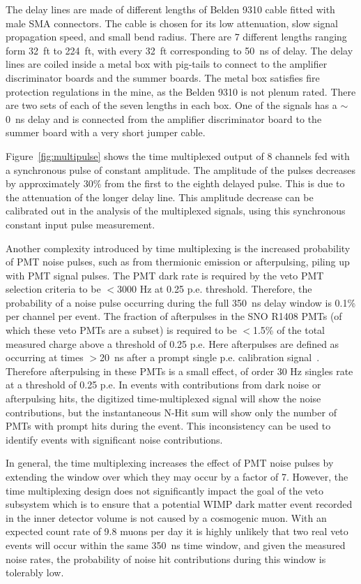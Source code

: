 \documentclass[review,number,sort&compress]{elsarticle}
\begin{document}
The delay lines are made of different lengths of Belden 9310 cable
fitted with male SMA connectors. The cable is chosen for its low
attenuation, slow signal propagation speed, and small bend radius.
There are 7 different lengths ranging form 32~ft to 224~ft, with every
32~ft corresponding to 50~ns of delay. The delay lines are coiled
inside a metal box with pig-tails to connect to the amplifier
discriminator boards and the summer boards. The metal box satisfies
fire protection regulations in the mine, as the Belden 9310 is not
plenum rated. There are two sets of each of the seven lengths in each
box.  One of the signals has a $\sim$0~ns delay and is connected from
the amplifier discriminator board to the summer board with a very short
jumper cable.

Figure~\ref{fig:multipulse} shows the time multiplexed output of 8
channels fed with a synchronous pulse of constant amplitude.  The
amplitude of the pulses decreases by approximately 30\% from the first
to the eighth delayed pulse.  This is due to the attenuation of the
longer delay line.  This amplitude decrease can be calibrated out in
the analysis of the multiplexed signals, using this synchronous
constant input pulse measurement.

Another complexity introduced by time multiplexing is the
increased probability of PMT noise pulses, such as from thermionic
emission or afterpulsing, piling up with PMT signal pulses.  The PMT
dark rate is required by the veto PMT selection criteria to be $<$3000
Hz at 0.25 p.e. threshold.  Therefore, the probability of a noise
pulse occurring during the full 350~ns delay window is 0.1\% per
channel per event.  The fraction of afterpulses in the SNO R1408 PMTs
(of which these veto PMTs are a subset) is required to be $<$1.5\% of
the total measured charge above a threshold of 0.25 p.e.  Here
afterpulses are defined as occurring at times $>$20~ns after a prompt
single p.e. calibration signal~\cite{ref:sno_pmt_paper}.  Therefore
afterpulsing in these PMTs is a small effect, of order 30 Hz singles
rate at a threshold of 0.25 p.e.  In events with contributions from
dark noise or afterpulsing hits, the digitized time-multiplexed signal
will show the noise contributions, but the instantaneous N-Hit sum
will show only the number of PMTs with prompt hits during the event.
This inconsistency can be used to identify events with significant
noise contributions.

In general, the time multiplexing increases the effect of PMT noise
pulses by extending the window over which they may occur by a factor
of 7. However, the time multiplexing design does not significantly
impact the goal of the veto subsystem which is to ensure that a
potential WIMP dark matter event recorded in the inner detector volume
is not caused by a cosmogenic muon. With an expected count rate of
9.8 muons per day it is highly unlikely that two real veto events will
occur within the same 350~ns time window, and given the measured noise
rates, the probability of noise hit contributions during this window
is tolerably low.
\end{document}
